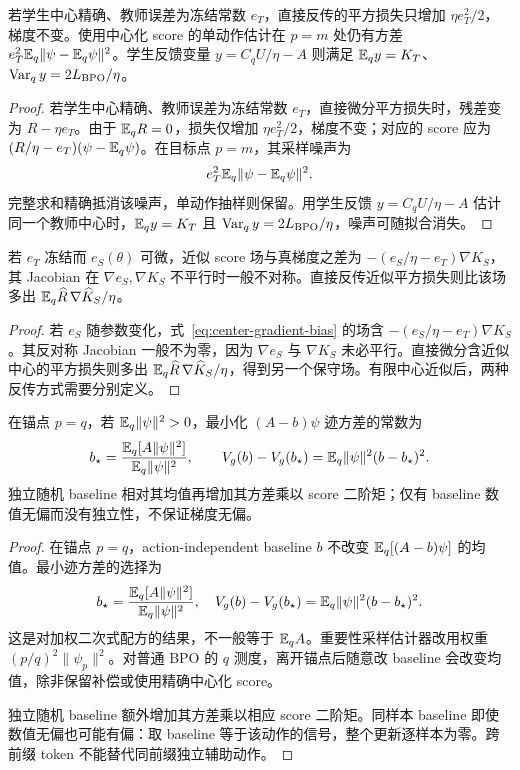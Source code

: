 \begin{proposition}[精确学生中心下的教师中心误差]
若学生中心精确、教师误差为冻结常数 $e_T$，直接反传的平方损失只增加 $\eta e_T^2/2$，梯度不变。使用中心化 score 的单动作估计在 $p=m$ 处仍有方差
$e_T^2\mathbb E_q\|\psi-\mathbb E_q\psi\|^2$。学生反馈变量 $y=C_qU/\eta-A$ 则满足 $\mathbb E_qy=K_T$、$\operatorname{Var}_qy=2L_{\rm BPO}/\eta$。
\end{proposition}
\begin{proof}
若学生中心精确、教师误差为冻结常数 $e_T$，直接微分平方损失时，残差变为 $R-\eta e_T$。由于 $\mathbb E_qR=0$，损失仅增加 $\eta e_T^2/2$，梯度不变；对应的 score 应为 $(R/\eta-e_T)(\psi-\mathbb E_q\psi)$。在目标点 $p=m$，其采样噪声为
\begin{equation}
e_T^2\mathbb E_q\|\psi-\mathbb E_q\psi\|^2.
\end{equation}
完整求和精确抵消该噪声，单动作抽样则保留。用学生反馈 $y=C_qU/\eta-A$ 估计同一个教师中心时，$\mathbb E_qy=K_T$ 且 $\operatorname{Var}_qy=2L_{\rm BPO}/\eta$，噪声可随拟合消失。
\end{proof}

\begin{proposition}[动态中心误差与保守性]
若 $e_T$ 冻结而 $e_S(\theta)$ 可微，近似 score 场与真梯度之差为 $-(e_S/\eta-e_T)\nabla K_S$，其 Jacobian 在 $\nabla e_S,\nabla K_S$ 不平行时一般不对称。直接反传近似平方损失则比该场多出 $\mathbb E_q\widehat R\,\nabla\widehat K_S/\eta$。
\end{proposition}
\begin{proof}
若 $e_S$ 随参数变化，式~\eqref{eq:center-gradient-bias} 的场含 $-(e_S/\eta-e_T)\nabla K_S$。其反对称 Jacobian 一般不为零，因为 $\nabla e_S$ 与 $\nabla K_S$ 未必平行。直接微分含近似中心的平方损失则多出 $\mathbb E_q\widehat R\,\nabla\widehat K_S/\eta$，得到另一个保守场。有限中心近似后，两种反传方式需要分别定义。
\end{proof}

\begin{proposition}
在锚点 $p=q$，若 $\mathbb E_q\|\psi\|^2>0$，最小化 $(A-b)\psi$ 迹方差的常数为
\begin{equation}
b_\star=\frac{\mathbb E_q[A\|\psi\|^2]}{\mathbb E_q\|\psi\|^2},\qquad
V_g(b)-V_g(b_\star)=\mathbb E_q\|\psi\|^2(b-b_\star)^2.
\end{equation}
独立随机 baseline 相对其均值再增加其方差乘以 score 二阶矩；仅有 baseline 数值无偏而没有独立性，不保证梯度无偏。
\end{proposition}
\begin{proof}
在锚点 $p=q$，action-independent baseline $b$ 不改变 $\mathbb E_q[(A-b)\psi]$ 的均值。最小迹方差的选择为
\begin{equation}
b_\star=\frac{\mathbb E_q[A\|\psi\|^2]}{\mathbb E_q\|\psi\|^2},\quad
V_g(b)-V_g(b_\star)=\mathbb E_q\|\psi\|^2(b-b_\star)^2.
\end{equation}
这是对加权二次式配方的结果，不一般等于 $\mathbb E_qA$。重要性采样估计器改用权重 $(p/q)^2\|\psi_p\|^2$。对普通 BPO 的 $q$ 测度，离开锚点后随意改 baseline 会改变均值，除非保留补偿或使用精确中心化 score。

独立随机 baseline 额外增加其方差乘以相应 score 二阶矩。同样本 baseline 即使数值无偏也可能有偏：取 baseline 等于该动作的信号，整个更新逐样本为零。跨前缀 token 不能替代同前缀独立辅助动作。
\end{proof}


